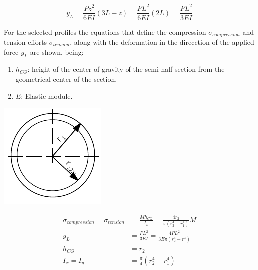   \begin{equation}
  \label{eq:deformation}
    y_L = \frac{P z^2}{6EI}(3L-z) = \frac{P L^2}{6EI}(2L) = \frac{P L^2}{3EI}
  \end{equation}


  For the selected profiles the equations that define the compression $\sigma _{compression}$ and tension efforts $\sigma _{tension}$, along with the deformation in the direcction of the applied force $y_L$ are shown, being:

  \begin{enumerate}
    \item $h_{CG}$: height of the center of gravity of the semi-half section from the geometrical center of the section.

    \item $E$: Elastic module.
  \end{enumerate}


  \noindent\begin{minipage}{0.2\textwidth}%
      \includegraphics[width=\linewidth]{figures/profile_cylinder.pdf}
  \end{minipage}%
  \hfill%
  \begin{minipage}{0.8\textwidth}
    \begin{equation}
      \begin{aligned}
      \sigma _{compression} = \sigma _{tension} &= \frac{M h_{CG}}{I_x} = \frac{4 r_2}{\pi(r_2 ^4 - r_1 ^4)} M \\
      y_L &= \frac{P L^2}{3EI} = \frac{4 P L^2}{3 E \pi(r_2 ^4 - r_1 ^4)}\\
      h_{CG} &= r_2 \\
      I_x = I_y &= \frac{\pi}{4} (r_2 ^4 - r_1 ^4)
      \end{aligned}
    \end{equation}
  \end{minipage}

